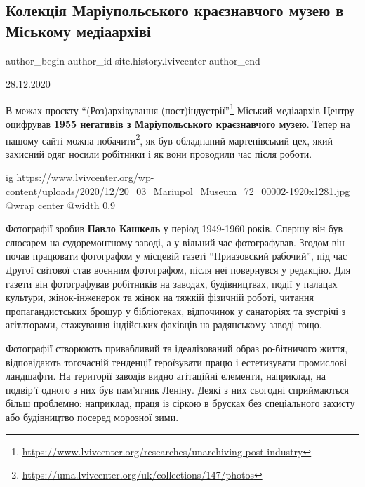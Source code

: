  
 
 
 
 
 
\subsection{Колекція Маріупольського краєзнавчого музею в Міському медіаархіві}
\label{sec:28_12_2020.stz.site.history.lvivcenter.1.mkm_kollekcia}
 
\ifcmt
 author_begin
   author_id site.history.lvivcenter
 author_end
\fi

28.12.2020

В межах проєкту \enquote{(Роз)архівування
(пост)індустрії}\footnote{\url{https://www.lvivcenter.org/researches/unarchiving-post-industry}}
Міський медіаархів Центру оцифрував \textbf{1955 негативів з Маріупольського
краєзнавчого музею}. Тепер на нашому сайті можна
побачити\footnote{\url{https://uma.lvivcenter.org/uk/collections/147/photos}},
як був обладнаний мартенівський цех, який захисний одяг носили робітники і як
вони проводили час після роботи.

\ifcmt
  ig https://www.lvivcenter.org/wp-content/uploads/2020/12/20_03_Mariupol_Museum_72_00002-1920x1281.jpg
  @wrap center
  @width 0.9
\fi

Фотографії зробив \textbf{Павло Кашкель} у період 1949-1960 років. Спершу він був
слюсарем на судоремонтному заводі, а у вільний час фотографував. Згодом він
почав працювати фотографом у місцевій газеті \enquote{Приазовский рабочий}, під час
Другої світової став воєнним фотографом, після неї повернувся у редакцію. Для
газети він фотографував робітників на заводах, будівництвах, події у палацах
культури, жінок-інженерок та жінок на тяжкій фізичній роботі, читання
пропагандистських брошур у бібліотеках, відпочинок у санаторіях та зустрічі з
агітаторами, стажування індійських фахівців на радянському заводі тощо.

Фотографії створюють привабливий та ідеалізований образ ро\hyp{}бітничого життя,
відповідають тогочасній тенденції героїзувати працю і естетизувати промислові
ландшафти. На території заводів видно агітаційні елементи, наприклад, на
подвір'ї одного з них був пам'ятник Леніну. Деякі з них сьогодні сприймаються
більш проблемно: наприклад, праця із сіркою в брусках без спеціального захисту
або будівництво посеред морозної зими.

